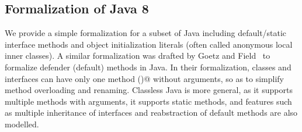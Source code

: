 \subsection{Formalization of Java 8}
We provide a simple formalization for a subset of Java including
default/static interface methods and object initialization literals
(often called anonymous local inner classes).  A similar formalization
was drafted by Goetz and Field~\cite{goetz12fdefenders} to formalize
defender (default) methods in Java. In their formalization, classes
and interfaces can have only one method \Q@m()@ without arguments, so
as to simplify method overloading and renaming. Classless Java is more
general, as it supports multiple methods with arguments, it supports
static methods, and features such as multiple inheritance of
interfaces and reabstraction of default methods are also modelled.
